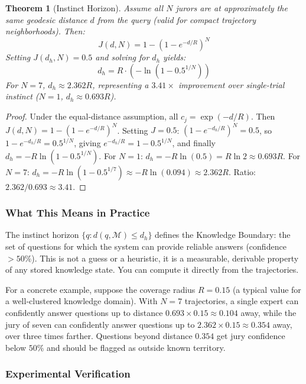 \documentclass[11pt]{article}
\newtheorem{theorem}{Theorem}[section]
\begin{document}
\begin{theorem}[Instinct Horizon]\label{thm:horizon}
Assume all $N$ jurors are at approximately the same geodesic distance $d$ from the query (valid for compact trajectory neighborhoods). Then:
\begin{equation}
J(d, N) = 1 - (1 - e^{-d/R})^N
\end{equation}
Setting $J(d_h, N) = 0.5$ and solving for $d_h$ yields:
\begin{equation}\label{eq:horizon}
d_h = R \cdot (-\ln(1 - 0.5^{1/N}))
\end{equation}
For $N=7$, $d_h \approx 2.362 R$, representing a $3.41\times$ improvement over single-trial instinct ($N=1$, $d_h \approx 0.693 R$).
\end{theorem}
\begin{proof}
Under the equal-distance assumption, all $c_j = \exp(-d/R)$. Then $J(d,N) = 1 - (1 - e^{-d/R})^N$. Setting $J = 0.5$: $(1 - e^{-d_h/R})^N = 0.5$, so $1 - e^{-d_h/R} = 0.5^{1/N}$, giving $e^{-d_h/R} = 1 - 0.5^{1/N}$, and finally $d_h = -R \ln(1 - 0.5^{1/N})$. For $N=1$: $d_h = -R \ln(0.5) = R \ln 2 \approx 0.693R$. For $N=7$: $d_h = -R \ln(1 - 0.5^{1/7}) \approx -R \ln(0.094) \approx 2.362R$. Ratio: $2.362/0.693 \approx 3.41$.
\end{proof}

\subsubsection*{What This Means in Practice}

The instinct horizon $\{q : d(q, \mathcal{M}) \le d_h\}$ defines the
Knowledge Boundary: the set of questions for which the system can
provide reliable answers (confidence $>50\%$). This is not a guess or a
heuristic, it is a measurable, derivable property of any stored
knowledge state. You can compute it directly from the trajectories.

For a concrete example, suppose the coverage radius $R = 0.15$ (a typical
value for a well-clustered knowledge domain). With $N=7$ trajectories,
a single expert can confidently answer questions up to distance
$0.693 \times 0.15 \approx 0.104$ away, while the jury of seven can
confidently answer questions up to $2.362 \times 0.15 \approx 0.354$
away, over three times farther. Questions beyond distance $0.354$ get
jury confidence below $50\%$ and should be flagged as outside known
territory.

\subsubsection*{Experimental Verification}
\end{document}
